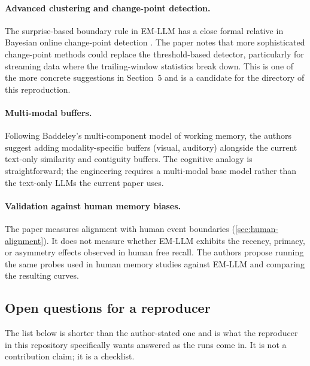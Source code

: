 \paragraph{Advanced clustering and change-point detection.}
The surprise-based boundary rule in EM-LLM has a close formal relative in Bayesian online change-point detection \cite{adams2007bayesian}. The paper notes that more sophisticated change-point methods could replace the threshold-based detector, particularly for streaming data where the trailing-window statistics break down. This is one of the more concrete suggestions in Section~5 and is a candidate for the  directory of this reproduction.

\paragraph{Multi-modal buffers.}
Following Baddeley's multi-component model of working memory, the authors suggest adding modality-specific buffers (visual, auditory) alongside the current text-only similarity and contiguity buffers. The cognitive analogy is straightforward; the engineering requires a multi-modal base model rather than the text-only LLMs the current paper uses.

\paragraph{Validation against human memory biases.}
The paper measures alignment with human event boundaries (\cref{sec:human-alignment}). It does not measure whether EM-LLM exhibits the recency, primacy, or asymmetry effects observed in human free recall. The authors propose running the same probes used in human memory studies against EM-LLM and comparing the resulting curves.

\subsection{Open questions for a reproducer}

The list below is shorter than the author-stated one and is what the reproducer in this repository specifically wants answered as the runs come in. It is not a contribution claim; it is a checklist.

